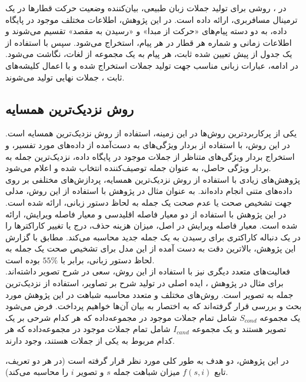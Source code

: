  در \cite{reiter1997building}، روشی برای تولید جملات زبان طبیعی، بیان‌کننده وضعیت حرکت قطارها در یک ترمینال مسافربری، ارائه داده است. در این پژوهش، اطلاعات مختلف موجود در پایگاه داده، به دو دسته پیام‌های «حرکت از مبدا» و «رسیدن به مقصد» تقسیم می‌شوند و اطلاعات زمانی و شماره هر قطار در هر پیام، استخراج می‌شود. سپس با استفاده از یک جدول از پیش تعیین شده ثابت، هر پیام به یک مجموعه از لغات، نگاشت می‌شود. در ادامه، عبارات زبانی مناسب جهت تولید جملات استخراج شده و با اعمال کلیشه‌های ثابت ، جملات نهایی تولید می‌شوند.

 
\subsection{روش نزدیک‌ترین همسایه}

یکی از پرکاربردترین روش‌ها در این زمینه، استفاده از روش نزدیک‌ترین همسایه است. در این روش، با استفاده از بردار ویژگی‌های به دست‌آمده از داده‌های مورد تفسیر، و استخراج بردار ویژگی‌های متناظر از جملات موجود در پایگاه داده، نزدیک‌ترین جمله به بردار ویژگی حاصل، به عنوان جمله توصیف‌کننده انتخاب شده و اعلام می‌شود.
\\
پژوهش‌های زیادی با استفاده از روش نزدیک‌ترین همسایه، پردازش‌های مختلفی بر روی داده‌های متنی انجام داده‌اند. به عنوان مثال در پژوهش \cite{lawrence1995natural} با استفاده از این روش، مدلی جهت تشخیص صحت یا عدم صحت یک جمله به لحاظ دستور زبانی، ارائه شده است. در این پژوهش با استفاده از دو معیار فاصله اقلیدسی و معیار فاصله ویرایش، ارائه شده است. معیار فاصله ویرایش در اصل، میزان هزینه حذف، درج یا تغییر کاراکترها را در یک دنباله کاراکتری برای رسیدن به یک جمله جدید محاسبه می‌کند. مطابق با گزارش این پژوهش، بالاترین دقت به دست آمده از این مدل برای تشخیص صحت یک جمله به لحاظ دستور زبانی، برابر با $55\%$ بوده است.
\\
فعالیت‌های متعدد دیگری نیز با استفاده از این روش، سعی در شرح تصویر داشته‌اند. برای مثال در پژوهش 
\cite{hodosh2013framing}،
 ایده اصلی در تولید شرح بر تصاویر، استفاده از نزدیک‌ترین جمله به تصویر است. روش‌های مختلف و متعدد محاسبه شباهت در این پژوهش مورد بحث و بررسی قرار گرفته‌اند که به اختصار به بیان آن‌ها خواهیم پرداخت. فرض می‌شود یک مجموعه
$S_{cond}$
شامل تمام جملات موجود در مجموعه‌داده که هر کدام شرحی بر یک تصویر هستند و یک مجموعه 
$I_{cand}$
شامل تمام جملات موجود در مجموعه‌داده که هر کدام مربوط به یکی از جملات هستند، وجود دارند.

 در این پژوهش، دو هدف به طور کلی مورد نظر قرار گرفته است (در هر دو تعریف، تابع 
 $f(s,i)$
  میزان شباهت جمله $s$  و تصویر $i$ را محاسبه می‌کند). 

